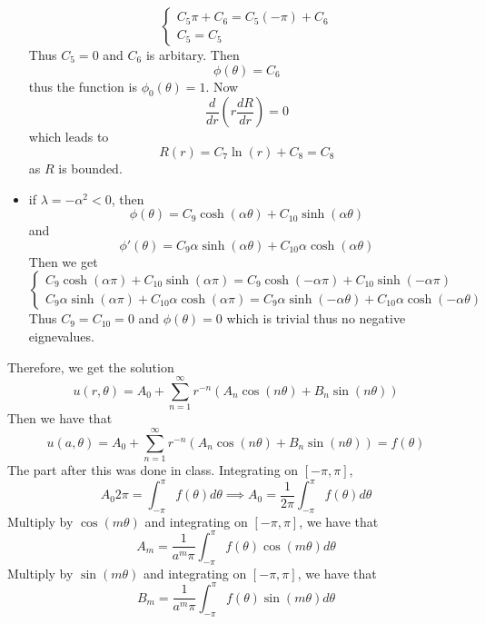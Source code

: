 \documentclass[11pt]{article}
\theoremstyle{mystyle}
\theoremstyle{definition}
\begin{document}
\begin{itemize}
    \[
      \begin{cases}
        C_5 \pi + C_6 = C_5(-\pi) + C_6 \\ 
        C_5 = C_5
      \end{cases}
    \]
    Thus $C_5 = 0$ and $C_6$ is arbitary. Then 
    \[
      \phi(\theta) = C_6
    \]
    thus the function is $\phi_0(\theta) = 1$. Now 
    \[
      \displaystyle\frac{d}{dr} \left(r \displaystyle\frac{dR}{dr}\right) = 0
    \] 
    which leads to 
    \[
      R(r) = C_7 \ln(r) + C_8 = C_8
    \]
    as $R$ is bounded. 
  \item if $\lambda = - \alpha^2 <0$, then 
    \[
      \phi(\theta) = C_9 \cosh(\alpha \theta) + C_{10} \sinh(\alpha \theta)
    \]
    and 
    \[
      \phi'(\theta) = C_9\alpha \sinh(\alpha \theta) + C_{10}\alpha \cosh(\alpha \theta)
    \]
    Then we get 
    \[
      \begin{cases}
        C_9 \cosh(\alpha \pi) + C_{10} \sinh(\alpha \pi) = C_9 \cosh(-\alpha \pi) + C_{10} \sinh(-\alpha \pi) \\
        C_9\alpha \sinh(\alpha \pi) + C_{10}\alpha \cosh(\alpha \pi) = C_9\alpha \sinh(-\alpha \theta) + C_{10}\alpha \cosh(-\alpha \theta)
      \end{cases}
    \]
    Thus $C_9 = C_{10} = 0$ and $\phi(\theta) = 0$ which is trivial thus no negative eignevalues. 
\end{itemize}
Therefore, we get the solution 
\[
  u(r, \theta) = A_0 + \sum_{n=1}^\infty r^{-n} (A_n \cos(n\theta) + B_n \sin(n\theta))
\]
Then we have that 
\[
  u(a, \theta) = A_0 + \sum_{n=1}^\infty r^{-n} (A_n \cos(n\theta) + B_n \sin(n\theta)) = f(\theta)
\]
The part after this was done in class. Integrating on $[-\pi, \pi]$, 
\[
  A_0 2\pi = \int_{-\pi}^\pi f(\theta) d\theta \implies A_0 = \displaystyle\frac{1}{2\pi} \int_{-\pi}^\pi f(\theta) d\theta 
\]
Multiply by $\cos(m\theta)$ and integrating on $[-\pi, \pi]$, we have that 
\[
  A_m = \displaystyle\frac{1}{a^m\pi} \int_{-\pi}^\pi f(\theta) \cos(m\theta)d\theta
\]
Multiply by $\sin(m\theta)$ and integrating on $[-\pi, \pi]$, we have that 
\[
  B_m = \displaystyle\frac{1}{a^m\pi} \int_{-\pi}^\pi f(\theta) \sin(m\theta)d\theta
\]
\end{document}
